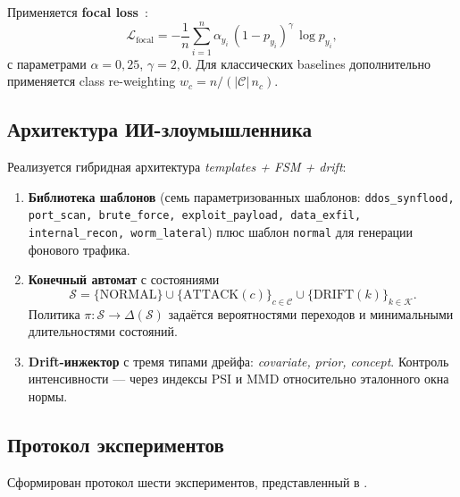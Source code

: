 Применяется \textbf{focal loss}~\cite{lin2017focal}:
\begin{equation}
\mathcal{L}_{\text{focal}} =
-\frac{1}{n}\sum_{i=1}^{n}
  \alpha_{y_i}\,(1-p_{y_i})^{\gamma}\,\log p_{y_i},
\label{eq:focal}
\end{equation}
с параметрами \(\alpha = 0{,}25\), \(\gamma = 2{,}0\). Для классических
baselines дополнительно применяется class re-weighting
\(w_c = n / (|\mathcal{C}|\,n_c)\).

\subsection{Архитектура ИИ-злоумышленника}

Реализуется гибридная архитектура \emph{templates + FSM + drift}:

\begin{enumerate}
    \item \textbf{Библиотека шаблонов} (семь параметризованных
    шаблонов: \texttt{ddos\_synflood, port\_scan, brute\_force,
    exploit\_payload, data\_exfil, internal\_recon, worm\_lateral})
    плюс шаблон \texttt{normal} для генерации фонового трафика.
    \item \textbf{Конечный автомат} с состояниями
    \[
    \mathcal{S} = \{\text{NORMAL}\} \cup
    \{\text{ATTACK}(c)\}_{c \in \mathcal{C}} \cup
    \{\text{DRIFT}(k)\}_{k \in \mathcal{K}}.
    \]
    Политика \(\pi\colon \mathcal{S} \to \Delta(\mathcal{S})\)
    задаётся вероятностями переходов и минимальными длительностями
    состояний.
    \item \textbf{Drift-инжектор} с тремя типами дрейфа:
    \emph{covariate, prior, concept}. Контроль интенсивности ---
    через индексы PSI и MMD относительно эталонного окна нормы.
\end{enumerate}

\subsection{Протокол экспериментов}

Сформирован протокол шести экспериментов, представленный в
.

